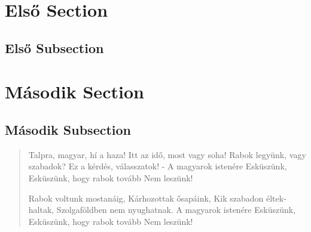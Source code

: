 \documentclass[twocolumn,twoside]{article}
\begin{document}
\appendix
\section{Első Section}
\subsection{Első Subsection}
\quote{\hulipsum[2]}
\section{Második Section}
\subsection{Második Subsection}
\quotation{\blindtext[2]}
\clearpage
\begin{verse}
Talpra, magyar, hí a haza!
Itt az idő, most vagy soha!
Rabok legyünk, vagy szabadok?
Ez a kérdés, válasszatok! -
A magyarok istenére
Esküszünk,
Esküszünk, hogy rabok tovább
Nem leszünk!

Rabok voltunk mostanáig,
Kárhozottak ősapáink,
Kik szabadon éltek-haltak,
Szolgaföldben nem nyughatnak.
A magyarok istenére
Esküszünk,
Esküszünk, hogy rabok tovább
Nem leszünk!


\end{verse}
\end{document}
